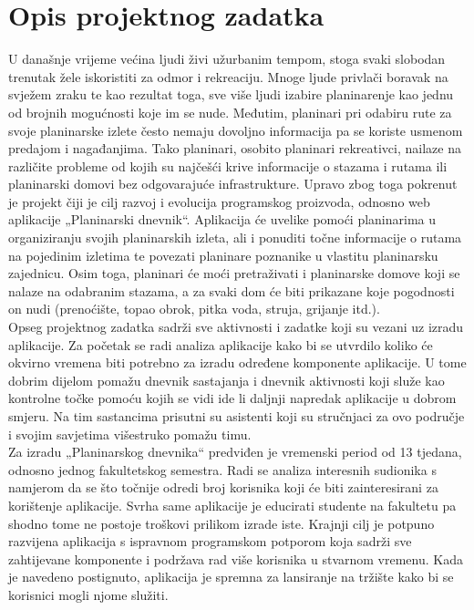 \chapter{Opis projektnog zadatka}
		
		
		U današnje vrijeme većina ljudi živi užurbanim tempom, stoga svaki slobodan trenutak žele iskoristiti za odmor i rekreaciju. Mnoge ljude privlači boravak na svježem zraku te kao rezultat toga, sve više ljudi izabire planinarenje kao jednu od brojnih mogućnosti koje im se nude. Međutim, planinari pri odabiru rute za svoje planinarske izlete često nemaju dovoljno informacija pa se koriste usmenom predajom i nagađanjima. Tako planinari, osobito planinari rekreativci, nailaze na različite probleme od kojih su najčešći krive informacije o stazama i rutama ili planinarski domovi bez odgovarajuće infrastrukture. Upravo zbog toga pokrenut je projekt čiji je cilj razvoj i evolucija programskog proizvoda, odnosno web aplikacije „Planinarski dnevnik“. Aplikacija će uvelike pomoći planinarima u organiziranju svojih planinarskih izleta, ali i ponuditi točne informacije o rutama na pojedinim izletima te povezati planinare poznanike u vlastitu planinarsku zajednicu. Osim toga, planinari će moći pretraživati i planinarske domove koji se nalaze na odabranim stazama, a za svaki dom će biti prikazane koje pogodnosti on nudi (prenoćište, topao obrok, pitka voda, struja, grijanje itd.). \\
		
		Opseg projektnog zadatka sadrži sve aktivnosti i zadatke koji su vezani uz izradu aplikacije. Za početak se radi analiza aplikacije kako bi se utvrdilo koliko će okvirno vremena biti potrebno za izradu određene komponente aplikacije. U tome dobrim dijelom pomažu dnevnik sastajanja i dnevnik aktivnosti koji služe kao kontrolne točke pomoću kojih se vidi ide li daljnji napredak aplikacije u dobrom smjeru. Na tim sastancima prisutni su asistenti koji su stručnjaci za ovo područje i svojim savjetima višestruko pomažu timu. \\
		
		Za izradu „Planinarskog dnevnika“ predviđen je vremenski period od 13 tjedana, odnosno jednog fakultetskog semestra. Radi se analiza interesnih sudionika s namjerom da se što točnije odredi broj korisnika koji će biti zainteresirani za korištenje aplikacije. Svrha same aplikacije je educirati studente na fakultetu pa shodno tome ne postoje troškovi prilikom izrade iste. Krajnji cilj je potpuno razvijena aplikacija s ispravnom programskom potporom koja sadrži sve zahtijevane komponente i podržava rad više korisnika u stvarnom vremenu. Kada je navedeno postignuto, aplikacija je spremna za lansiranje na tržište kako bi se korisnici mogli njome služiti.\\
		
